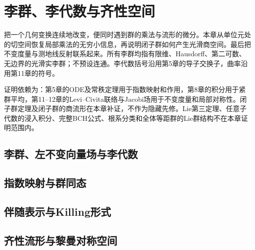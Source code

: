 \chapter{李群、李代数与齐性空间}
\label{ch:15-lie-groups}

把一个几何变换连续地改变，便同时遇到群的乘法与流形的微分。本章从单位元处的切空间恢复局部乘法的无穷小信息，再说明闭子群如何产生光滑商空间。最后把不变度量与测地线反射联系起来。所有李群均指有限维、Hausdorff、第二可数、无边界的光滑实李群；不预设连通。李代数括号沿用第5章的导子交换子，曲率沿用第11章的符号。

证明依赖为：第5章的ODE及常秩定理用于指数映射和作用，第8章的积分用于紧群平均，第11--12章的Levi--Civita联络与Jacobi场用于不变度量和局部对称性。闭子群定理及闭子群的商流形在本章补证，不作为隐藏先修。Lie第三定理、任意子代数的浸入积分、完整BCH公式、根系分类和全体等距群的Lie群结构不在本章证明范围内。

\section{李群、左不变向量场与李代数}


\section{指数映射与群同态}


\section{伴随表示与Killing形式}


\section{齐性流形与黎曼对称空间}




